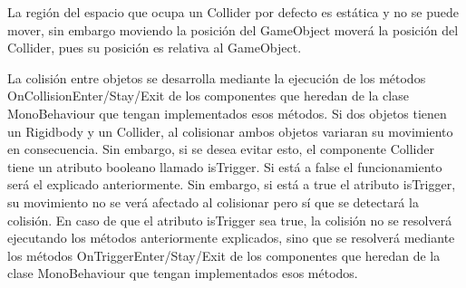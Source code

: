 La región del espacio que ocupa un Collider por defecto es estática y no se puede mover, sin embargo moviendo la posición del GameObject moverá la posición del Collider, pues su posición es relativa al GameObject.

La colisión entre objetos se desarrolla mediante la ejecución de los métodos OnCollisionEnter/Stay/Exit de los componentes que heredan de la clase MonoBehaviour que tengan implementados esos métodos. 
Si dos objetos tienen un Rigidbody y un Collider, al colisionar ambos objetos variaran su movimiento en consecuencia. Sin embargo, si se desea evitar esto, el componente Collider tiene un atributo booleano llamado isTrigger. Si está a false el funcionamiento será el explicado anteriormente. Sin embargo, si está a true el atributo isTrigger, su movimiento no se verá afectado al colisionar pero sí que se detectará la colisión. En caso de que el atributo isTrigger sea true, la colisión no se resolverá ejecutando los métodos anteriormente explicados, sino que se resolverá mediante los métodos OnTriggerEnter/Stay/Exit de los componentes que heredan de la clase MonoBehaviour que tengan implementados esos métodos.
